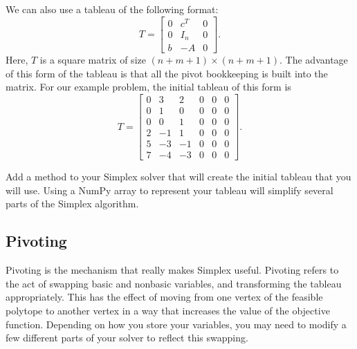 We can also use a tableau of the following format:
\begin{equation}
T = \begin{bmatrix}
    0 & c^T  & 0 \\
    0 & I_n & 0\\
    b & -A  & 0
\end{bmatrix}.
\label{eqn:matrix_tab}
\end{equation}
Here, $T$ is a square matrix of size $(n+m+1) \times (n+m+1)$.
The advantage of this form of the tableau is that all the pivot bookkeeping is built into the matrix.
For our example problem, the initial tableau of this form is
\begin{equation}
T = \begin{bmatrix}
        0 & 3 & 2 & 0 & 0 & 0 \\
        0 & 1 & 0 & 0 & 0 & 0 \\
        0 & 0 & 1 & 0 & 0 & 0 \\
        2 &-1 & 1 & 0 & 0 & 0 \\
        5 &-3 &-1 & 0 & 0 & 0 \\
        7 &-4 &-3 & 0 & 0 & 0
\end{bmatrix}.
\label{eqn:matrix_inittab}
\end{equation}

\begin{problem}
Add a method to your Simplex solver that will create the initial tableau that you will use.
Using a NumPy array to represent your tableau will simplify several parts of the Simplex algorithm.
\label{prob:maketableau}
\end{problem}

\subsection*{Pivoting} %

Pivoting is the mechanism that really makes Simplex useful.
Pivoting refers to the act of swapping basic and nonbasic variables, and transforming the tableau appropriately.
This has the effect of moving from one vertex of the feasible polytope to another vertex in a way that increases the value of the objective function.
Depending on how you store your variables, you may need to modify a few different parts of your solver to reflect this swapping.

